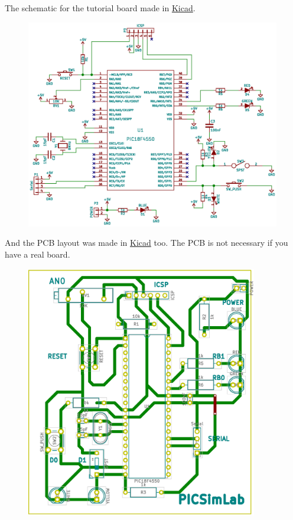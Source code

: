 The schematic for the tutorial board made in \href{http://kicad-pcb.org/}{Kicad}.
\begin{figure}[H]
\center
\includegraphics[width=0.99\textwidth]{board_x/board_x.eps} 
\end{figure} 

\pagebreak
And the PCB layout was made in \href{http://kicad-pcb.org/}{Kicad} too. The PCB is not necessary if you have a real board.

\begin{figure}[H]
\center
\includegraphics[width=0.9\textwidth, angle=0]{board_x/board_x_pcb.eps} 
\end{figure} 


